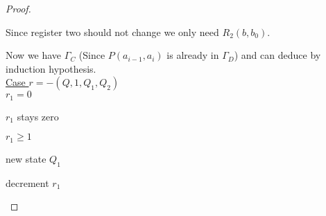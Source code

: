\begin{proof}
\begin{figure}[H]

\end{figure}
Since register two should not change we only need $R_2(b,b_0)$.

\begin{figure}[H]

\end{figure}
Now we have $\Gamma_C$ (Since $P(a_{i-1},a_i)$ is already in $\Gamma_D$) and can deduce \false{} by induction hypothesis.\\
\underline{Case $r=-(Q,1,Q_1,Q_2)$}
\\\uline{$r_1=0$}

\begin{figure}[H]

\end{figure}

$r_1$ stays zero

\begin{figure}[H]

\end{figure}
\uline{$r_1\geq1$}

new state $Q_1$

\begin{figure}[H]

\end{figure}

decrement $r_1$

\begin{figure}[H]

\end{figure}

\end{proof}